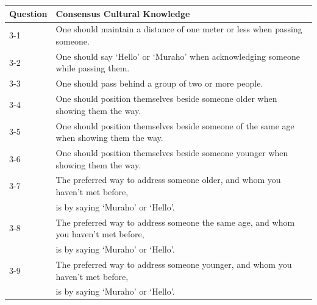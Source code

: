 \documentclass{CSSRforAfrica}
\begin{document}
\newpage
\begin{table}[H]
\begin{center}
\vspace{-7mm}
\begin{tabularx}{\linewidth}{|l |X|}
\hline \hline
 {\small {\bf Question}}  & {\small {\bf Consensus Cultural Knowledge}}\\
\hline
\vspace{-0.2mm} {\small 3-1 }   & {\small One should maintain a distance of one meter or less when passing someone.}\\
\vspace{-0.2mm} {\small 3-2 }  & {\small One should say `Hello' or `Muraho' when acknowledging someone while passing them.}\\
\vspace{-0.2mm}  {\small 3-3 }  & {\small One should pass behind a group of two or more people.}\\

\vspace{-0.2mm} {\small 3-4 } & {\small One should position themselves beside someone older when showing them the way.}\\

\vspace{-0.2mm} {\small 3-5 }  & {\small One should position themselves beside someone of the same age when showing them the way.}\\

\vspace{-0.5mm} {\small 3-6 }  & {\small One should position themselves beside someone younger when showing them the way.}\\

\vspace{-0.2mm} {\small 3-7}   & {\small The preferred way to address someone older, and whom you haven't met before, }\\
\vspace{-0.2mm} {\small }   & {\small  is by saying `Muraho' or `Hello'.}\\

\vspace{-0.2mm} {\small 3-8}   & {\small The preferred way to address someone the same age, and whom you haven't met before,  }\\
\vspace{-0.2mm} {\small }   & {\small is by saying  `Muraho' or `Hello'.}\\

\vspace{-0.2mm} {\small 3-9}   & {\small The preferred way to address someone younger, and whom you haven't met before,  }\\
\vspace{-0.2mm} {\small }   & {\small is by saying  `Muraho' or `Hello'.}\\


\end{tabularx}
\end{center}
\end{table}
\end{document}
